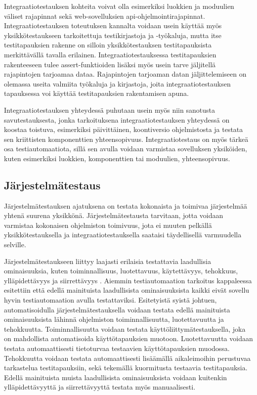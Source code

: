     Integraatiotestauksen kohteita voivat olla esimerkiksi luokkien ja moduulien väliset rajapinnat sekä web-sovelluksien api-ohjelmointirajapinnat.
    Integraatiotestauksen toteutuksen kannalta voidaan usein käyttää myös yksikkötestaukseen tarkoitettuja testikirjastoja ja -työkaluja, mutta itse testitapauksien rakenne on silloin yksikkötestauksen testitapauksista merkittävällä tavalla erilainen.
    Integraatiotestauksessa testitapauksien rakenteeseen tulee assert-funktioiden lisäksi myös usein tarve jäljitellä rajapintojen tarjoamaa dataa.
    Rajapintojen tarjoaman datan jäljittelemiseen on olemassa useita valmiita työkaluja ja kirjastoja, joita integraatiotestauksen tapauksessa voi käyttää testitapauksien rakentamisen apuna.

    Integraatiotestauksen yhteydessä puhutaan usein myös niin sanotusta savutestauksesta, jonka tarkoituksena integraatiotestauksen yhteydessä on koostaa toistuva, esimerkiksi päivittäinen, koontiversio ohjelmistosta ja testata sen kriittisten komponenttien yhteensopivuus.
    Integraatiotestaus on myös tärkeä osa testiautomaatiota, sillä sen avulla voidaan varmistaa sovelluksen yksiköiden, kuten esimerkiksi luokkien, komponenttien tai moduulien, yhteensopivuus.

  \subsection{Järjestelmätestaus} \label{ch:07_jarjestelmatestaus}

    Järjestelmätestauksen ajatuksena on testata kokonaista ja toimivaa järjestelmää yhtenä suurena yksikkönä.
    Järjestelmätestausta tarvitaan, jotta voidaan varmistaa kokonaisen ohjelmiston toimivuus, jota ei muuten pelkällä yksikkötestauksella ja integraatiotestauksella saataisi täydellisellä varmuudella selville.

    Järjestelmätestaukseen liittyy laajasti erilaisia testattavia laadullisia ominaisuuksia, kuten toiminnallisuus, luotettavuus, käytettävyys, tehokkuus, ylläpidettävyys ja siirrettävyys \cite{iso_quality_attributes}.
    Aiemmin testiautomaation tarkoitus kappaleessa esitettiin että edellä mainituista laadullisista ominaisuuksista kaikki eivät sovellu hyvin testiautomaation avulla testattaviksi.
    Esitetyistä syistä johtuen, automatisoidulla järjestelmätestauksella voidaan testata edellä mainituista ominaisuuksista lähinnä ohjelmiston toiminnallisuutta, luotettavuutta ja tehokkuutta.
    Toiminnallisuutta voidaan testata käyttöliittymätestauksella, joka on mahdollista automatisoida käyttötapauksien muotoon.
    Luotettavuutta voidaan testata automaattisesti tietoturvaa testaavien käyttötapauksien muodossa.
    Tehokkuutta voidaan testata automaattisesti lisäämällä aikaleimoihin perustuvaa tarkastelua testitapauksiin, sekä tekemällä kuormitusta testaavia testitapauksia.
    Edellä mainituista muista laadullisista ominaisuuksista voidaan kuitenkin ylläpidettävyyttä ja siirrettävyyttä testata myös manuaalisesti.

